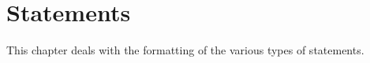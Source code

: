 \chapter{Statements}
This chapter deals with the formatting of the various types of statements.








